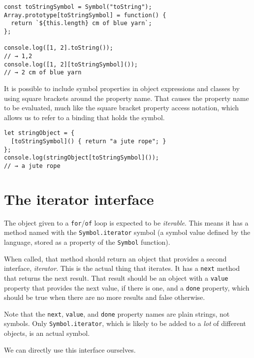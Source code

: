 \begin{lstlisting}
const toStringSymbol = Symbol("toString");
Array.prototype[toStringSymbol] = function() {
  return `${this.length} cm of blue yarn`;
};

console.log([1, 2].toString());
// → 1,2
console.log([1, 2][toStringSymbol]());
// → 2 cm of blue yarn
\end{lstlisting}
\noindent{}

It is possible to include symbol properties in object expressions and classes by using square brackets around the property name. That causes the property name to be evaluated, much like the square bracket property access notation, which allows us to refer to a binding that holds the symbol.

\begin{lstlisting}
let stringObject = {
  [toStringSymbol]() { return "a jute rope"; }
};
console.log(stringObject[toStringSymbol]());
// → a jute rope
\end{lstlisting}
\noindent

\section{The iterator interface}

The object given to a \lstinline`for`/\lstinline`of` loop is expected to be \emph{iterable}. This means it has a method named with the \lstinline`Symbol.iterator` symbol (a symbol value defined by the language, stored as a property of the \lstinline`Symbol` function).

When called, that method should return an object that provides a second interface, \emph{iterator}. This is the actual thing that iterates. It has a \lstinline`next` method that returns the next result. That result should be an object with a \lstinline`value` property that provides the next value, if there is one, and a \lstinline`done` property, which should be true when there are no more results and false otherwise.

Note that the \lstinline`next`, \lstinline`value`, and \lstinline`done` property names are plain strings, not symbols. Only \lstinline`Symbol.iterator`, which is likely to be added to a \emph{lot} of different objects, is an actual symbol.

We can directly use this interface ourselves.

